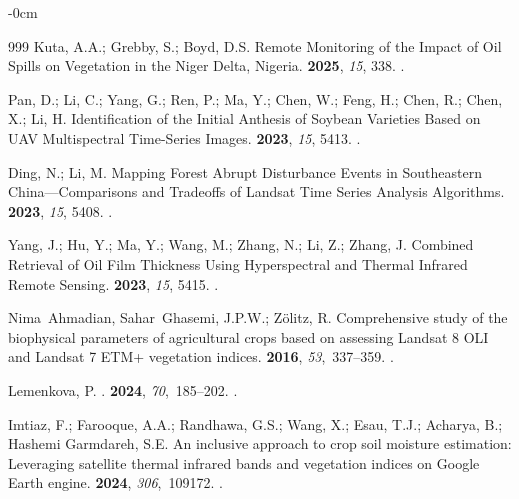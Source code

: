 \documentclass[geomatics,article,accept,pdftex,oneauthor]{Definitions/mdpi}
\begin{document}
\begin{adjustwidth}{-\extralength}{0cm}
\begin{thebibliography}{999}
Kuta, A.A.; Grebby, S.; Boyd, D.S.
\newblock Remote Monitoring of the Impact of Oil Spills on Vegetation in the
  Niger Delta, Nigeria.
 {\bf 2025}, {\em 15}, 338.
.

Pan, D.; Li, C.; Yang, G.; Ren, P.; Ma, Y.; Chen, W.; Feng, H.; Chen, R.; Chen,
  X.; Li, H.
\newblock Identification of the Initial Anthesis of Soybean Varieties Based on
  UAV Multispectral Time-Series Images.
 {\bf 2023}, {\em 15}, 5413.
.

Ding, N.; Li, M.
\newblock Mapping Forest Abrupt Disturbance Events in Southeastern
  China---Comparisons and Tradeoffs of Landsat Time Series Analysis Algorithms.
 {\bf 2023}, {\em 15}, 5408.
.

Yang, J.; Hu, Y.; Ma, Y.; Wang, M.; Zhang, N.; Li, Z.; Zhang, J.
\newblock Combined Retrieval of Oil Film Thickness Using Hyperspectral and
  Thermal Infrared Remote Sensing.
 {\bf 2023}, {\em 15}, 5415.
.

Nima~Ahmadian, Sahar~Ghasemi, J.P.W.; Zölitz, R.
\newblock Comprehensive study of the biophysical parameters of agricultural
  crops based on assessing Landsat 8 OLI and Landsat 7 ETM+ vegetation indices.
 {\bf 2016}, {\em 53},~337--359.
.

Lemenkova, P.
.
 {\bf 2024}, {\em 70},~185--202.
.

Imtiaz, F.; Farooque, A.A.; Randhawa, G.S.; Wang, X.; Esau, T.J.; Acharya, B.;
  {Hashemi Garmdareh}, S.E.
\newblock An inclusive approach to crop soil moisture estimation: Leveraging
  satellite thermal infrared bands and vegetation indices on Google Earth
  engine.
 {\bf 2024}, {\em 306},~109172.
.


\end{thebibliography}
\end{adjustwidth}
\end{document}
